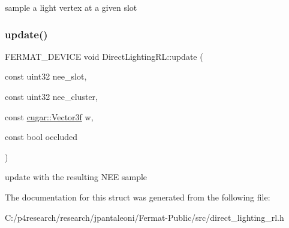 sample a light vertex at a given slot \mbox{\label{struct_direct_lighting_r_l_a466b9f6099b9332f1def390e45636b3a}} 
\subsubsection{\texorpdfstring{update()}{update()}}
{\footnotesize\ttfamily F\+E\+R\+M\+A\+T\+\_\+\+D\+E\+V\+I\+CE void Direct\+Lighting\+R\+L\+::update (\begin{DoxyParamCaption}\item[{const uint32}]{nee\+\_\+slot,  }\item[{const uint32}]{nee\+\_\+cluster,  }\item[{const \hyperlink{structcugar_1_1_vector}{cugar\+::\+Vector3f}}]{w,  }\item[{const bool}]{occluded }\end{DoxyParamCaption})\hspace{0.3cm}{\ttfamily [inline]}}

update with the resulting N\+EE sample 

The documentation for this struct was generated from the following file\+:\begin{DoxyCompactItemize}
\item 
C\+:/p4research/research/jpantaleoni/\+Fermat-\/\+Public/src/direct\+\_\+lighting\+\_\+rl.\+h\end{DoxyCompactItemize}
